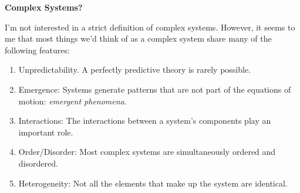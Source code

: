 \documentclass[%
  color,
  epsf,
  url,
  amssymb,
  semhelv,%
  portrait,%
  semlayer%
  ]{seminar}
\begin{document}
\begin{slide*}
\centerslidesfalse
\begin{center}
{\bf Complex Systems?}
\end{center}



I'm not interested in a strict definition of complex systems.
However, it seems to me that most things we'd think of as a complex
system share many of the following features:

\begin{enumerate}


\item Unpredictability.  A perfectly predictive theory is rarely
possible. 

\item Emergence: Systems generate patterns that are not part of the
equations of motion:  {\em emergent phenomena}. 

\item Interactions: The interactions between a system's components
play an important role. 

\item Order/Disorder:  Most complex systems are simultaneously ordered
and disordered. 

\item Heterogeneity:  Not all the elements that make up the system are
identical.  

\end{enumerate}

\end{slide*}
\end{document}
